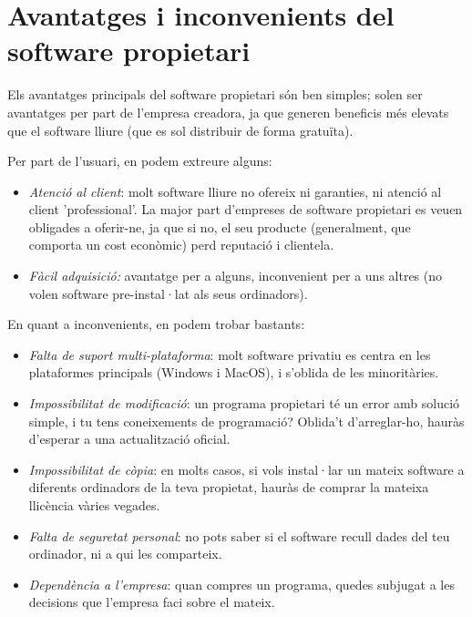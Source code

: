 \section{Avantatges i inconvenients del software propietari}

Els avantatges principals del software propietari  són ben simples; solen ser avantatges per part
de l'empresa creadora, ja que generen beneficis més elevats que el software lliure (que es sol distribuir
de forma gratuïta).

Per part de l'usuari, en podem extreure alguns:

\begin{itemize}
\item \emph{Atenció al client}: molt software lliure no ofereix ni garanties, ni atenció al client 'professional'.
La major part d'empreses de software propietari es veuen obligades a oferir-ne, ja que si no, el seu producte (generalment,
que comporta un cost econòmic) perd reputació i clientela.
\item \emph{Fàcil adquisició:} avantatge per a alguns, inconvenient per a uns altres (no volen software pre-instal·lat als seus
ordinadors).
\end{itemize}

En quant a inconvenients, en podem trobar bastants:
\begin{itemize}
\item \emph{Falta de suport multi-plataforma}: molt software privatiu es centra en les plataformes principals (Windows i MacOS),
i s'oblida de les minoritàries.
\item \emph{Impossibilitat de modificació}: un programa propietari té un error amb solució simple, i tu tens coneixements de
programació? Oblida't d'arreglar-ho, hauràs d'esperar a una actualització oficial.
\item \emph{Impossibilitat de còpia}: en molts casos, si vols instal·lar un mateix software a diferents ordinadors de la teva
propietat, hauràs de comprar la mateixa llicència vàries vegades.
\item \emph{Falta de seguretat personal}: no pots saber si el software recull dades del teu ordinador, ni a qui les comparteix.
\item \emph{Dependència a l'empresa}: quan compres un programa, quedes subjugat a les decisions que l'empresa faci sobre el mateix.
\end{itemize}

 \cite{gentegeek}


